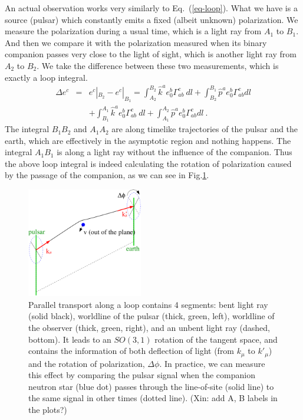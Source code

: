 \documentclass[aps,showpacs,twocolumn,floats,prd,superscriptaddress,nofootinbib]{revtex4}
\begin{document}
An actual observation works very similarly to Eq.~(\ref{eq-loop}). 
What we have is a source (pulsar) which constantly emits a fixed (albeit unknown) polarization. 
We measure the polarization during a usual time, which is a light ray from $A_1$ to $B_1$. 
And then we compare it with the polarization measured when its binary companion passes very close to the light of sight, which is another light ray from $A_2$ to $B_2$. 
We take the difference between these two measurements, which is exactly a loop integral.
\begin{eqnarray}
\Delta e^c &=& e^c|_{ B_2} - e^c|_{ B_1}
= \int_{A_2}^{B_2} \hat{k}^a e_0^b \Gamma_{ab}^c~dl
 + \int_{B_2}^{B_1} \hat{p}^a e_0^b \Gamma_{ab}^c dl  \nonumber \\ 
&&+ \int_{B_1}^{A_1} \hat{k}^a e_0^b \Gamma_{ab}^c~dl +
\int_{A_1}^{A_2} \hat{p}^a e_0^b \Gamma_{ab}^c dl~.
\label{eq-pulsar}
\end{eqnarray}
The integral $B_1B_2$ and $A_1A_2$ are along timelike trajectories of the pulsar and the earth, which are effectively in the asymptotic region and nothing happens. 
The integral $A_1B_1$ is along a light ray without the influence of the companion. 
Thus the above loop integral is indeed calculating the rotation of polarization caused by the passage of the companion, as we can see in Fig.\ref{fig:loop}.

\begin{figure}
\includegraphics[width=0.45\textwidth]{loop.pdf}
\caption{\label{fig:loop}
Parallel transport along a loop contains 4 segments: bent light ray (solid black), worldline of the pulsar (thick, green, left), worldline of the observer (thick, green, right), and an unbent light ray (dashed, bottom). It leads to an $SO(3,1)$ rotation of the tangent space, and contains the information of both deflection of light (from $k_\mu$ to $k'_\mu$) and the rotation of polarization, $\Delta\phi$. In practice, we can measure this effect by comparing the pulsar signal when the companion neutron star (blue dot) passes through the line-of-site (solid line) to the same signal in other times (dotted line).
{\color{red}(Xin: add A, B labels in the plots?) }  }
\end{figure}
\end{document}
